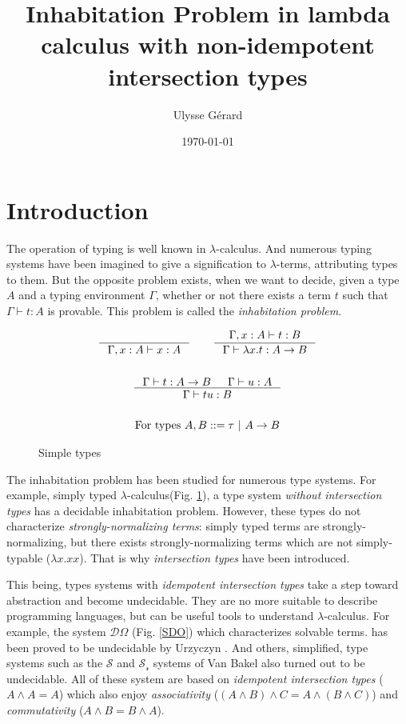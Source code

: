 \documentclass{article}
\title{\textbf{Inhabitation Problem in lambda calculus with non-idempotent intersection types}}
\author{Ulysse Gérard}
\date\today
\def\lcalc{$\lambda$-calculus}
\def\lterms{$\lambda$-terms}
\def\ver{\ |\ }
\begin{document}
\maketitle

\section{Introduction}
The operation of typing is well known in \lcalc. And numerous typing systems have been imagined to give a signification to \lterms, attributing types to them. But the opposite problem exists, when we want to decide, given a type $A$ and a typing environment $\Gamma$, whether or not there exists a term $t$ such that $\Gamma \vdash t : A$ is provable. This problem is called the \emph{inhabitation problem}.
\begin{figure}
    \begin{mdframed}
        \begin{gather*}
        \inference[]{}{\Gamma, x:A\vdash x:A}
        \qquad \inference[]{\Gamma, x:A \vdash t:B}{\Gamma \vdash \lambda x.t:A->B}
        \\ \\ \inference[]{\Gamma \vdash t : A -> B & \Gamma \vdash u : A} {\Gamma \vdash tu : B}
        \\ \\ \text{For types } A, B ::= \tau\ver A \rightarrow B
        \end{gather*}
    \end{mdframed}
    \caption{Simple types}
    \label{STY}
\end{figure}


The inhabitation problem has been studied for numerous type systems. For example, simply typed \lcalc (Fig. \ref{STY}), a type system \emph{without intersection types} has a decidable inhabitation problem. However, these types do not characterize \emph{strongly-normalizing terms}: simply typed terms are strongly-normalizing, but there exists strongly-normalizing terms which are not simply-typable ($\lambda x.xx$). That is why \emph{intersection types} have been introduced.

This being, types systems with \emph{idempotent intersection types} take a step toward abstraction and become undecidable. They are no more suitable to describe programming languages, but can be useful tools to understand \lcalc. For example, the system $\mathcal{D}\Omega$ (Fig. \ref{SDO}) \cite{Kriv} which characterizes solvable terms. %
has been proved to be undecidable by Urzyczyn \cite{Urz}. And others, simplified, type systems such as the  $\mathcal{S}$ and $\mathcal{S_r}$ systems of Van Bakel \cite{VBak} also turned out to be undecidable. All of these system are based on \emph{idempotent intersection types} ($A\wedge A = A$) which also enjoy \emph{associativity} ($(A\wedge B)\wedge C = A\wedge (B\wedge C)$) and \emph{commutativity} ($A\wedge B=B\wedge A$).
\end{document}
